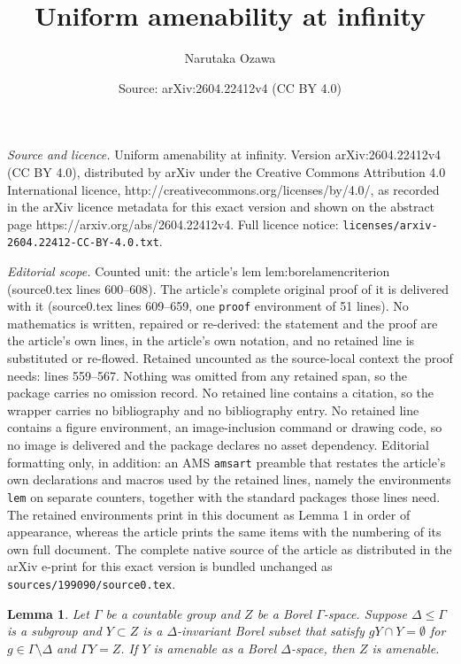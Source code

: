 \documentclass[10pt,a4paper]{amsart}
\title{Uniform amenability at infinity}
\author{Narutaka Ozawa}
\date{Source: arXiv:2604.22412v4 (CC BY 4.0)}
\newtheorem{lem}{Lemma}
\newcommand{\Ga}{\Gamma}
\begin{document}
\maketitle

\noindent\emph{Source and licence.} Uniform amenability at infinity. Version arXiv:2604.22412v4 (CC BY 4.0), distributed by arXiv under the Creative Commons Attribution 4.0 International licence, http://creativecommons.org/licenses/by/4.0/, as recorded in the arXiv licence metadata for this exact version and shown on the abstract page https://arxiv.org/abs/2604.22412v4. Full licence notice: \texttt{licenses/arxiv-2604.22412-CC-BY-4.0.txt}.\par\smallskip

\noindent\textit{Editorial scope.} Counted unit: the article's lem lem:borelamencriterion (source0.tex lines 600--608). The article's complete original proof of it is delivered with it (source0.tex lines 609--659, one \texttt{proof} environment of 51 lines). No mathematics is written, repaired or re-derived: the statement and the proof are the article's own lines, in the article's own notation, and no retained line is substituted or re-flowed.  Retained uncounted as the source-local context the proof needs: lines 559--567.  Nothing was omitted from any retained span, so the package carries no omission record.  No retained line contains a citation, so the wrapper carries no bibliography and no bibliography entry.  No retained line contains a figure environment, an image-inclusion command or drawing code, so no image is delivered and the package declares no asset dependency.  Editorial formatting only, in addition: an AMS \texttt{amsart} preamble that restates the article's own declarations and macros used by the retained lines, namely the environments \texttt{lem} on separate counters, together with the standard packages those lines need.  The retained environments print in this document as Lemma 1 in order of appearance, whereas the article prints the same items with the numbering of its own full document.  The complete native source of the article as distributed in the arXiv e-print for this exact version is bundled unchanged as \texttt{sources/199090/source0.tex}.
\begin{lem}\label{lem:fd} 
Let $\Ga$ be a countable group and 
$Z$ be a Borel $\Ga$-space. 
Suppose $\Delta\le\Ga$ is a subgroup and $Y\subset Z$ is 
a $\Delta$-invariant Borel subset that satisfy 
$gY\cap Y=\emptyset$ for $g\in\Ga\setminus\Delta$ and  
$\Ga Y=Z$.  
If $Y$ is amenable as a Borel $\Delta$-space, then $Z$ is amenable. 
\end{lem}
\end{document}
